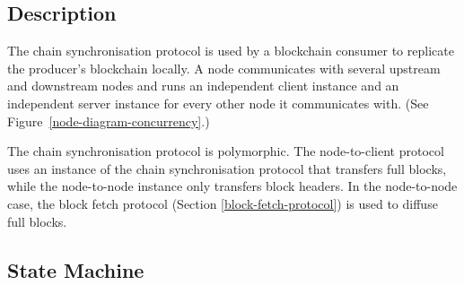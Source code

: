 \newcommand{\StCanAwait}{\state{StCanAwait}}
\newcommand{\StMustReply}{\state{StMustReply}}
\newcommand{\StIntersect}{\state{StIntersect}}
\newcommand{\MsgRequestNext}{\msg{MsgRequestNext}}
\newcommand{\MsgAwaitReply}{\msg{MsgAwaitReply}}
\newcommand{\MsgRollForward}{\msg{MsgRollForward}}
\newcommand{\MsgRollBackward}{\msg{MsgRollBackward}}
\newcommand{\MsgFindIntersect}{\msg{MsgFindIntersect}}
\newcommand{\MsgIntersectFound}{\msg{MsgIntersectFound}}
\newcommand{\MsgIntersectNotFound}{\msg{MsgIntersectNotFound}}

\subsection{Description}
The chain synchronisation protocol is used by a blockchain consumer
to replicate the producer's blockchain locally.
A node communicates with several upstream and downstream nodes
and runs an independent client instance and an independent server instance for every
other node it communicates with.
(See Figure~\ref{node-diagram-concurrency}.)

The chain synchronisation protocol is polymorphic.
The node-to-client protocol uses an instance of the chain synchronisation protocol
that transfers full blocks, while the node-to-node instance only transfers block headers.
In the node-to-node case, the block fetch protocol (Section \ref{block-fetch-protocol})
is used to diffuse full blocks.

\subsection{State Machine}

